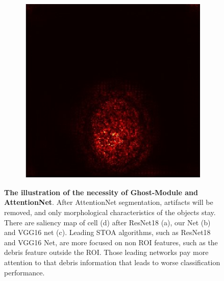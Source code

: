 \begin{figure}[h]
\begin{center}
\begin{subfigure}[b]{0.25\textwidth}
		    \centering
			\includegraphics[height= 0.15\textheight]{thesis-template-master/images/hd1 (4550)vggnetWithcellyolo.jpg}
			\caption{}
			\label{fig:cellnet}
		\end{subfigure}
	\end{center}
	\caption{\textbf{The illustration of the necessity of Ghost-Module and AttentionNet}. After AttentionNet segmentation, artifacts will be removed, and only morphological characteristics of the objects stay. There are saliency map of cell (d) after ResNet18\cite{20} (a), our Net (b) and VGG16 net \cite{23} (c). Leading  STOA  algorithms, such as ResNet18 and VGG16 Net, are more focused on non  ROI  features,  such as the debris feature outside the ROI. Those leading networks pay more attention to that debris information that leads to worse classification performance.}
\end{figure}

